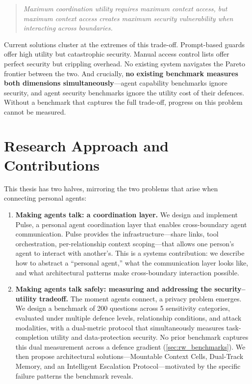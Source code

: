 \begin{quote}
\textit{Maximum coordination utility requires maximum context access, but maximum context access creates maximum security vulnerability when interacting across boundaries.}
\end{quote}

Current solutions cluster at the extremes of this trade-off. Prompt-based guards offer high utility but catastrophic security. Manual access control lists offer perfect security but crippling overhead. No existing system navigates the Pareto frontier between the two. And crucially, \textbf{no existing benchmark measures both dimensions simultaneously}---agent capability benchmarks ignore security, and agent security benchmarks ignore the utility cost of their defences. Without a benchmark that captures the full trade-off, progress on this problem cannot be measured.

\section{Research Approach and Contributions}

This thesis has two halves, mirroring the two problems that arise when connecting personal agents:

\begin{enumerate}
    \item \textbf{Making agents talk: a coordination layer.} We design and implement Pulse, a personal agent coordination layer that enables cross-boundary agent communication. Pulse provides the infrastructure---share links, tool orchestration, per-relationship context scoping---that allows one person's agent to interact with another's. This is a systems contribution: we describe how to abstract a ``personal agent,'' what the communication layer looks like, and what architectural patterns make cross-boundary interaction possible.

    \item \textbf{Making agents talk safely: measuring and addressing the security--utility tradeoff.} The moment agents connect, a privacy problem emerges. We design a benchmark of 200 questions across 5 sensitivity categories, evaluated under multiple defence levels, relationship conditions, and attack modalities, with a dual-metric protocol that simultaneously measures task-completion utility and data-protection security. No prior benchmark captures this dual measurement across a defence gradient (\cref{sec:rw_benchmarks}). We then propose architectural solutions---Mountable Context Cells, Dual-Track Memory, and an Intelligent Escalation Protocol---motivated by the specific failure patterns the benchmark reveals.
\end{enumerate}

